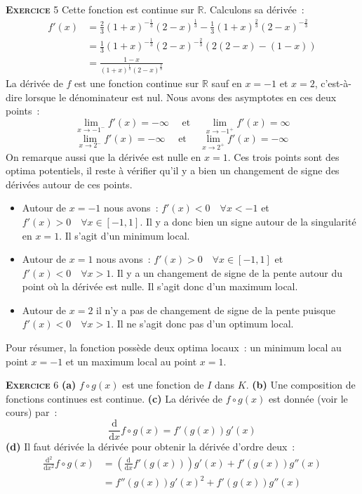 \documentclass[10pt,a4paper,notitlepage]{article}
\newcommand{\exercice}[1]{\textsc{\textbf{Exercice}} #1}
\begin{document}
\bigskip

\exercice{5} Cette fonction est continue sur $\mathbb R$. Calculons sa dérivée :
\[
  \begin{split}
    f'(x) &= \frac{2}{3}(1+x)^{-\frac{1}{3}}(2-x)^{\frac{1}{3}} -
    \frac{1}{3}(1+x)^{\frac{2}{3}}(2-x)^{-\frac{2}{3}}\\
    &= \frac{1}{3}(1+x)^{-\frac{1}{3}}(2-x)^{-\frac{2}{3}}\left(2(2-x)-(1-x)\right)\\
    &=\frac{1-x}{(1+x)^{\frac{1}{3}}(2-x)^{\frac{2}{3}}}
  \end{split}
\]
La dérivée de $f$ est une fonction continue sur $\mathbb R$ sauf en $x=-1$ et $x=2$, c'est-à-dire lorsque le dénominateur est nul. Nous avons des asymptotes en ces deux points :
\[
\lim_{x\rightarrow -1^-}f'(x) = -\infty  \quad\text{ et }\quad  \lim_{x\rightarrow -1^+}f'(x) = \infty
\]
\[
\lim_{x\rightarrow 2^-}f'(x) = -\infty  \quad\text{ et }\quad  \lim_{x\rightarrow 2^+}f'(x) = -\infty
\]
On remarque aussi que la dérivée est nulle en $x=1$. Ces trois points sont des optima potentiels, il reste à vérifier qu'il y a bien un changement de signe des dérivées autour de ces points.

\medskip

\begin{itemize}

\item Autour de $x=-1$ nous avons : $f'(x)<0\quad \forall x<-1$ et $f'(x)>0\quad\forall x\in[-1,1]$. Il y a donc bien un signe autour de la singularité en $x=1$. Il s'agit d'un minimum local.

\item Autour de $x=1$ nous avons : $f'(x)>0\quad\forall x\in[-1,1]$ et $f'(x)<0\quad\forall x>1$. Il y a un changement de signe de la pente autour du point où la dérivée est nulle. Il s'agit donc d'un maximum local.

\item Autour de $x=2$ il n'y a pas de changement de signe de la pente puisque  $f'(x)<0\quad\forall x>1$. Il ne s'agit donc pas d'un optimum local.
\end{itemize} 

\medskip

Pour résumer, la fonction possède deux optima locaux : un minimum local au point $x=-1$ et un maximum local au point $x=1$.

\bigskip

\exercice{6} \textbf{(a)} $f \circ g (x)$ est une fonction de $I$ dans $K$. \textbf{(b)} Une composition de fonctions continues est continue. \textbf{(c)} La dérivée de $f \circ g (x)$ est donnée (voir le cours) par :
\[
\frac{\mathrm d}{\mathrm dx}f \circ g (x) = f'(g(x))g'(x)
\]
\textbf{(d)} Il faut dérivée la dérivée pour obtenir la dérivée d'ordre deux :
\[
  \begin{split}
    \frac{\mathrm d^2}{\mathrm dx^2}f \circ g (x) &= \left(\frac{\mathrm d}{\mathrm dx}f'(g(x))\right)g'(x)+f'(g(x))g''(x)\\
    &= f''(g(x))g'(x)^2+f'(g(x))g''(x)
  \end{split}
\]
\end{document}
